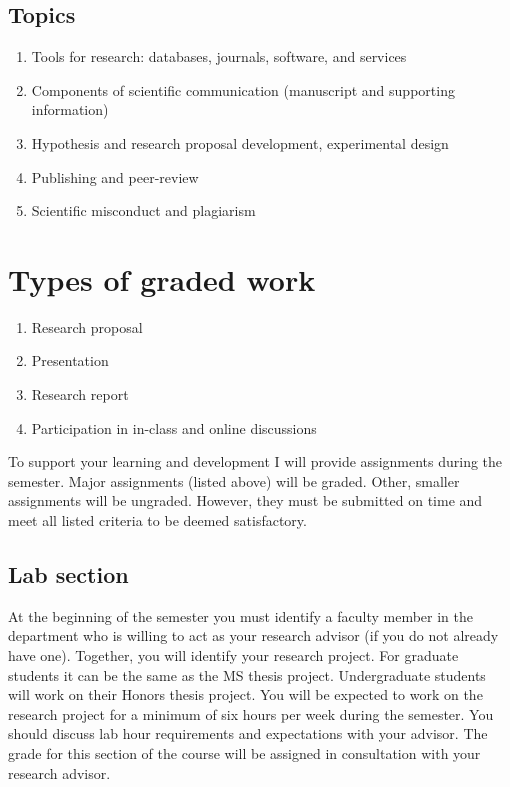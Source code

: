 \hypertarget{topics}{%
\subsection{Topics}\label{topics}}

\begin{enumerate}
\def\labelenumi{\arabic{enumi}.}
\tightlist
\item
  Tools for research: databases, journals, software, and services
\item
  Components of scientific communication (manuscript and supporting
  information)
\item
  Hypothesis and research proposal development, experimental design
\item
  Publishing and peer-review
\item
  Scientific misconduct and plagiarism
\end{enumerate}

\hypertarget{types-of-graded-work}{%
\section{Types of graded work}\label{types-of-graded-work}}

\begin{enumerate}
\def\labelenumi{\arabic{enumi}.}
\tightlist
\item
  Research proposal
\item
  Presentation
\item
  Research report
\item
  Participation in in-class and online discussions
\end{enumerate}

To support your learning and development I will provide assignments
during the semester. Major assignments (listed above) will be graded.
Other, smaller assignments will be ungraded. However, they must be
submitted on time and meet all listed criteria to be deemed
satisfactory.

\hypertarget{lab-section}{%
\subsection{Lab section}\label{lab-section}}

At the beginning of the semester you must identify a faculty member in
the department who is willing to act as your research advisor (if you do
not already have one). Together, you will identify your research
project. For graduate students it can be the same as the MS thesis
project. Undergraduate students will work on their Honors thesis
project. You will be expected to work on the research project for a
minimum of six hours per week during the semester. You should discuss
lab hour requirements and expectations with your advisor. The grade for
this section of the course will be assigned in consultation with your
research advisor.


